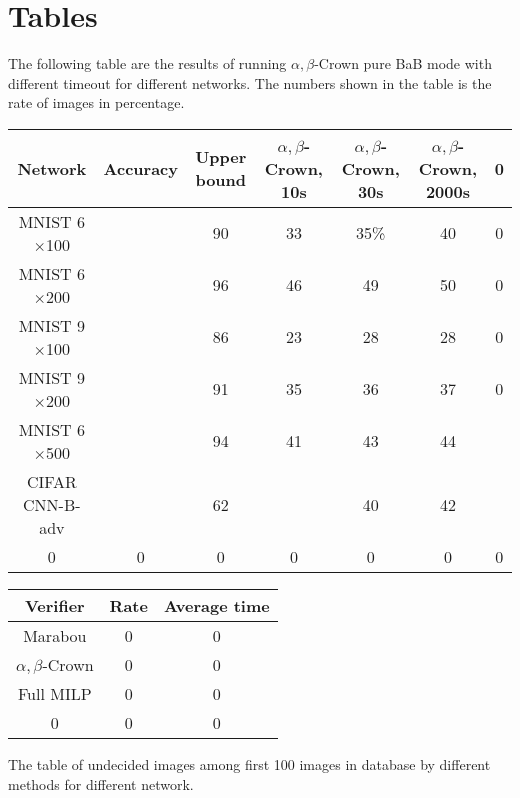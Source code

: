 



\section*{Tables}

The following table are the results of running $\alpha,\beta$-Crown pure BaB mode with different timeout for different networks. The numbers shown in the table is the rate of images in percentage.

\begin{tabular}{|c|c|c|c|c|c|c|}
	\hline
	Network & Accuracy & Upper bound & $\alpha,\beta$-Crown, 10s & $\alpha,\beta$-Crown, 30s & $\alpha,\beta$-Crown, 2000s &  0 \\ \hline
	MNIST 6$\times$100 &  & 90 & 33 & 35\% & 40  &  0 \\ \hline
	MNIST 6$\times$200 &   & 96  & 46  & 49  & 50  &  0 \\ \hline
	MNIST 9$\times$100 &   & 86  & 23  & 28  & 28  &  0 \\ \hline
	MNIST 9$\times$200 &   & 91  & 35  & 36  & 37  &  0 \\ \hline
	MNIST 6$\times$500 &   & 94  & 41  & 43  & 44  &    \\ \hline
	CIFAR CNN-B-adv &   & 62  &   & 40  & 42  &    \\ \hline
	0 & 0 & 0 & 0 & 0 & 0 & 0  \\ \hline
\end{tabular}

\vspace*{4ex}
\begin{tabular}{|c|c|c|}
	\hline
	Verifier & Rate & Average time \\ \hline
	Marabou & 0 & 0 \\ \hline
	$\alpha,\beta$-Crown & 0 & 0 \\ \hline
	Full MILP & 0 & 0 \\ \hline
	0 & 0 & 0 \\ \hline
\end{tabular}



\vspace*{4ex}

The table of undecided images among first 100 images in database by different methods for different network.

